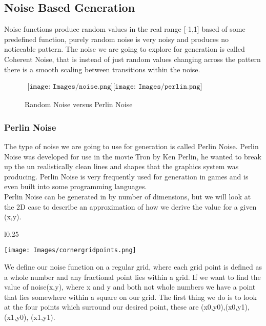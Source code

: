 \subsection{Noise Based Generation}
Noise functions produce random values in the real range [-1,1] based of some 
predefined function, purely random noise is very noisy and produces no noticeable
pattern. The noise we are going to explore for generation is called Coherent
Noise, that is instead of just random values changing across the pattern there 
is a smooth scaling between transitions within the noise.\\

\begin{figure}[h!]
	\begin{center}$
		\begin{array}{cc}
			\texttt{[image: Images/noise.png]}
			\texttt{[image: Images/perlin.png]}
		\end{array}$
	\end{center}
	\caption{Random Noise versus Perlin Noise}
\end{figure}
\newpage

\subsubsection*{Perlin Noise}
The type of noise we are going to use for generation is called Perlin Noise. 
Perlin Noise was developed for use in the movie Tron by Ken Perlin, he wanted to
break up the un realistically clean lines and shapes that the graphics system was
producing. Perlin Noise is very frequently used for generation in games and is 
even built into some programming languages.\\

Perlin Noise can be generated in by number of dimensions, but we will look at the
2D case to describe an approximation of how we derive the value for a given 
(x,y).\\
\begin{wrapfigure}{l}{0.25\textwidth}
	\begin{center}
			\texttt{[image: Images/cornergridpoints.png]}
	\end{center}
\end{wrapfigure}

We define our noise function on a regular grid, where each grid point is defined as
a whole number and any fractional point lies within a grid. If we want to find the
value of noise(x,y), where x and y and both not whole numbers we have a point that
lies somewhere within a square on our grid. The first thing we do is to look at the
four points which surround our desired point, these are (x0,y0),(x0,y1),(x1,y0),
(x1,y1).\\

